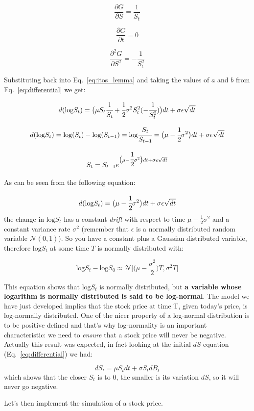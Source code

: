 \[\frac{\partial G}{\partial S} = \frac{1}{S_t}\]

\[\frac{\partial G}{\partial t} = 0\]

\[\frac{\partial^2 G}{\partial S^2} = -\frac{1}{S_t^{2}}\]

Substituting back into Eq.~\ref{eq:itos_lemma} and taking the values of $a$ and $b$ from Eq.~\ref{eq:differential} we get:

\[d(\textrm{log} S_t) = \big(\mu S_t \cfrac{1}{S_t} + \cfrac{1}{2}\sigma^2 S_t^2 (-\cfrac{1}{S_t^2})\big)dt + \sigma\epsilon\sqrt{dt}\]

\[d(\textrm{log} S_t) = \textrm{log} (S_t) - \textrm{log} (S_{t-1}) = \textrm{log} \cfrac{S_t}{S_{t-1}} = \big(\mu - \cfrac{1}{2}\sigma^2\big)dt + \sigma\epsilon\sqrt{dt}\]

\[S_t = S_{t-1}e^{\big(\mu - \cfrac{1}{2}\sigma^2\big)dt + \sigma\epsilon\sqrt{dt}}\]

As can be seen from the following equation:

\[d(\textrm{log} S_t) = \big(\mu - \cfrac{1}{2}\sigma^2\big)dt + \sigma\epsilon\sqrt{dt}\]
the change in \(\textrm{log} S_t\) has a constant \emph{drift} with respect to time 
\(\mu - \frac{1}{2}\sigma^2\) and a constant variance rate \(\sigma^2\)
(remember that \(\epsilon\) is a normally distributed random variable
\(\mathcal{N}(0,1)\)). So you have a constant plus a Gaussian
distributed variable, therefore \(\textrm{log} S_t\) at some time \(T\)
is normally distributed with:

\[\textrm{log}S_t - \textrm{log}S_0 \approx\mathcal{N}\big[\big(\mu-\frac{\sigma^2}{2}\big)T, \sigma^2 T\big]\]

This equation shows that \(\textrm{log}S_t\) is normally distributed,
but \textbf{a variable whose logarithm is normally distributed is said
to be log-normal}. The model we have just developed implies that
the stock price at time T, given today's price, is log-normally
distributed. One of the nicer property of a log-normal distribution is to be positive defined and that's why log-normality is an important characteristic: we need to \emph{ensure} that a stock price will never be negative. Actually this result was expected, in fact looking at the initial \(dS\) equation (Eq.~\ref{eq:differential}) we had:

\[dS_t = \mu S_tdt + \sigma S_tdB_t\]
which shows that the closer \(S_t\) is to 0, the smaller is its variation \(dS\), so it will never go negative.

Let's then implement the simulation of a stock price.

